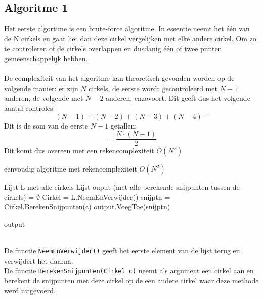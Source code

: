 \documentclass[11pt,a4paper]{article}
\begin{document}
\subsection{Algoritme 1}
Het eerste algortime is een brute-force algoritme. In essentie neemt het \'e\'en van de N cirkels en gaat het dan deze cirkel vergelijken met elke andere cirkel. Om zo te controleren of de cirkels overlappen en dusdanig \'e\'en of twee punten gemeenschappelijk hebben.
\\
\\
De complexiteit van het algoritme kan theoretisch gevonden worden op de volgende manier: er zijn $N$ cirkels, de eerste wordt gecontroleerd met $N-1$ anderen, de volgende met $N-2$ anderen, enzovoort. Dit geeft dus het volgende aantal controles:
$$(N-1) + (N-2) + (N-3) + (N - 4) \cdots $$
Dit is de som van de eerste $N-1$ getallen:
$$ = \frac{N\cdot (N-1)}{2} $$
Dit komt dus overeen met een rekencomplexiteit $O(N^2)$
\begin{algorithm}
\caption{eenvoudig algoritme met rekencomplexiteit $O(N^2)$}
\begin{algorithmic}
\State Lijst L met alle cirkels
\State Lijst ouput (met alle berekende snijpunten tussen de cirkels) = $\emptyset$
	\State Cirkel = L.NeemEnVerwijder()
	\State snijptn = Cirkel.BerekenSnijpunten(c)
	\State output.VoegToe(snijptn)
	\EndFor
\EndWhile

\Return output
\end{algorithmic}
\end{algorithm}
\\
De functie \verb|NeemEnVerwijder()| geeft het eerste element van de lijst terug en verwijdert het daarna.\\
De functie \verb|BerekenSnijpunten(Cirkel c)| neemt als argument een cirkel aan en berekent de snijpunten met deze cirkel op de een andere cirkel waar deze methode werd uitgevoerd.
\end{document}
